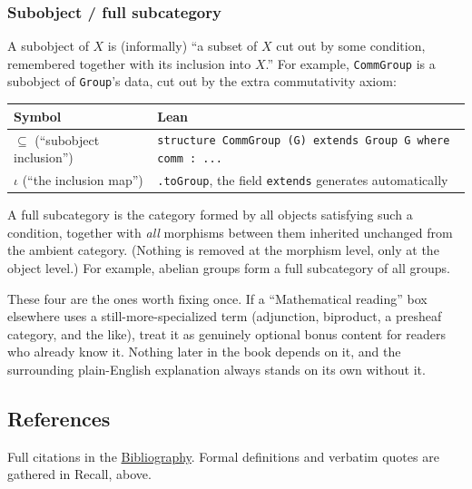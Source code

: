 \subsubsection{Subobject / full subcategory}\label{sec:01-basics:04-terminology:11}

A subobject of \(X\) is (informally) ``a subset of \(X\) cut out by some condition, remembered together with its inclusion into \(X\).'' For example, \texttt{CommGroup} is a subobject of \texttt{Group}'s data, cut out by the extra commutativity axiom:

\begin{center}

\end{center}

{\small\begin{tabular}{
  >{\raggedright\arraybackslash}p{}
  >{\raggedright\arraybackslash}p{}
}
\toprule
Symbol & Lean \\
\midrule
\(\subseteq\) (``subobject inclusion'') & \texttt{structure CommGroup (G) extends Group G where comm : ...} \\
\(\iota\) (``the inclusion map'') & \texttt{.toGroup}, the field \texttt{extends} generates automatically \\
\bottomrule
\end{tabular}}


A full subcategory is the category formed by all objects satisfying such a condition, together with \emph{all} morphisms between them inherited unchanged from the ambient category. (Nothing is removed at the morphism level, only at the object level.) For example, abelian groups form a full subcategory of all groups.

These four are the ones worth fixing once. If a ``Mathematical reading'' box elsewhere uses a still-more-specialized term (adjunction, biproduct, a presheaf category, and the like), treat it as genuinely optional bonus content for readers who already know it. Nothing later in the book depends on it, and the surrounding plain-English explanation always stands on its own without it.

\subsection{References}\label{sec:01-basics:04-terminology:12}

Full citations in the \hyperref[sec:root:bibliography:1]{Bibliography}. Formal definitions and verbatim quotes are gathered in Recall, above.

